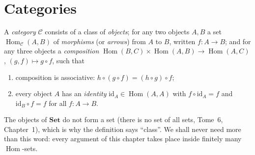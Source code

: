 \section{Categories}

\begin{definition}\label{def:category}
A \emph{category} $\mathcal C$ consists of a class of \emph{objects}; for any two objects $A,B$ a set $\operatorname{Hom}_{\mathcal C}(A,B)$ of \emph{morphisms} (or \emph{arrows}) from $A$ to $B$,
written $f\colon A\to B$; and for any three objects a \emph{composition} $\operatorname{Hom}(B,C)\times\operatorname{Hom}(A,B)\to\operatorname{Hom}(A,C)$, $(g,f)\mapsto g\circ f$, such that
\begin{enumerate}[label=(\roman*)]
\item composition is associative: $h\circ(g\circ f)=(h\circ g)\circ f$;
\item every object $A$ has an \emph{identity} $\mathrm{id}_A\in\operatorname{Hom}(A,A)$ with $f\circ\mathrm{id}_A=f$ and $\mathrm{id}_B\circ f=f$ for all $f\colon A\to B$.
\end{enumerate}
\end{definition}

The objects of $\mathbf{Set}$ do not form a set (there is no set of all sets, Tome~6, Chapter~1), which is why the definition says ``class''. We shall never need more than this
word: every argument of this chapter takes place inside finitely many $\operatorname{Hom}$-sets.

